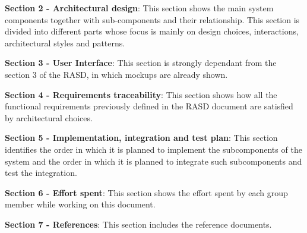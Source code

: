 \textbf{Section 2 - Architectural design}: This section shows the main system components together with sub-components and their relationship. This section is divided into different parts whose focus is mainly on design choices, interactions, architectural styles and patterns.\newline

\textbf{Section 3 - User Interface}: This section is strongly dependant from the section 3 of the RASD, in which mockups are already shown.\newline

\textbf{Section 4 - Requirements traceability}: This section shows how all the functional requirements previously defined in the RASD document are satisfied by architectural choices.\newline

\textbf{Section 5 - Implementation, integration and test plan}: This section identifies the order in which it is planned to implement the subcomponents of the system and the order in which it is planned to integrate such subcomponents and test the integration.\newline

\textbf{Section 6 - Effort spent}: This section shows the effort spent by each group member while working on this document.\newline

\textbf{Section 7 - References}: This section includes the reference documents.

%